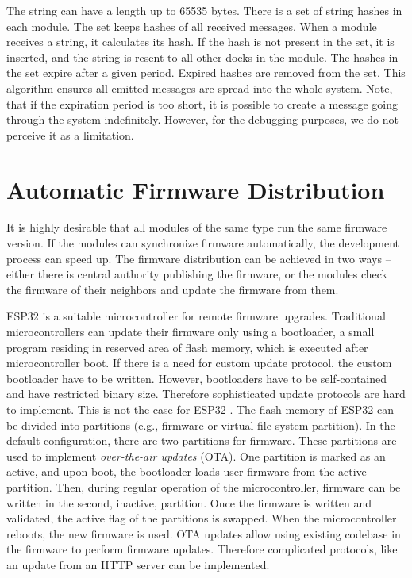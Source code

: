 \noindent The string can have a length up to 65535 bytes. There is a set of
string hashes in each module. The set keeps hashes of all received messages.
When a module receives a string, it calculates its hash. If the hash is not
present in the set, it is inserted, and the string is resent to all other docks
in the module. The hashes in the set expire after a given period. Expired hashes
are removed from the set. This algorithm ensures all emitted messages are spread
into the whole system. Note, that if the expiration period is too short, it is
possible to create a message going through the system indefinitely. However, for
the debugging purposes, we do not perceive it as a limitation.

\section{Automatic Firmware Distribution} \label{sec:firmware_distribution}

It is highly desirable that all modules of the same type run the same firmware
version. If the modules can synchronize firmware automatically, the development
process can speed up. The firmware distribution can be achieved in two ways --
either there is central authority publishing the firmware, or the modules check
the firmware of their neighbors and update the firmware from them.

ESP32 is a suitable microcontroller for remote firmware upgrades. Traditional
microcontrollers can update their firmware only using a bootloader, a small
program residing in reserved area of flash memory, which is executed after
microcontroller boot. If there is a need for custom update protocol, the custom
bootloader have to be written. However, bootloaders have to be self-contained
and have restricted binary size. Therefore sophisticated update protocols are
hard to implement. This is not the case for ESP32
\cite{noauthor_esp-idf_nodate}. The flash memory of ESP32 can be divided into
partitions (e.g., firmware or virtual file system partition). In the default
configuration, there are two partitions for firmware. These partitions are used
to implement \emph{over-the-air updates} (OTA). One partition is marked as an
active, and upon boot, the bootloader loads user firmware from the active
partition. Then, during regular operation of the microcontroller, firmware can
be written in the second, inactive, partition. Once the firmware is written and
validated, the active flag of the partitions is swapped. When the
microcontroller reboots, the new firmware is used. OTA updates allow using
existing codebase in the firmware to perform firmware updates. Therefore
complicated protocols, like an update from an HTTP server can be implemented.

